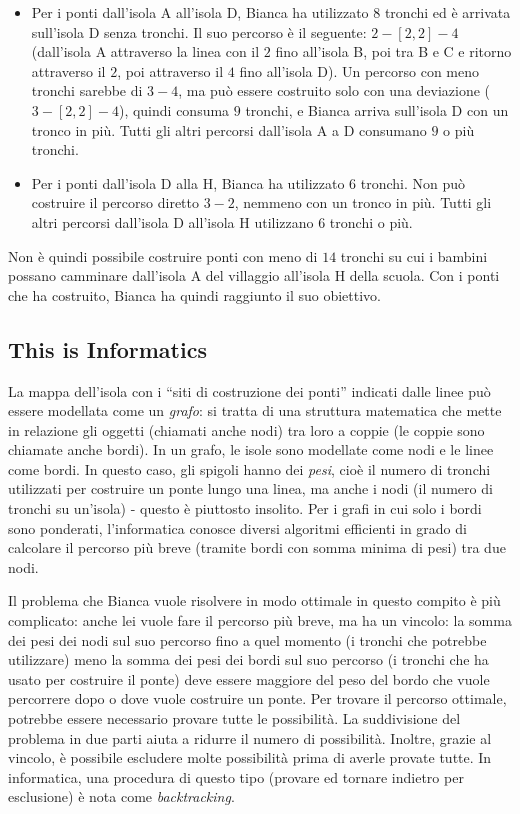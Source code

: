 \documentclass[a4paper,11pt]{report}
\begin{document}
\begin{itemize}
  \item Per i ponti dall’isola A all’isola D, Bianca ha utilizzato $8$ tronchi ed è arrivata sull’isola D senza tronchi.  Il suo percorso è il seguente: ${2-[2,2]-4}$ (dall’isola A attraverso la linea con il $2$ fino all’isola B, poi tra B e C e ritorno attraverso il $2$, poi attraverso il $4$ fino all’isola D). Un percorso con meno tronchi sarebbe di ${3-4}$, ma può essere costruito solo con una deviazione (${3-[2,2]-4}$), quindi consuma $9$ tronchi, e Bianca arriva sull’isola D con un tronco in più. Tutti gli altri percorsi dall’isola A a D consumano $9$ o più tronchi.
  \item Per i ponti dall’isola D alla H, Bianca ha utilizzato $6$ tronchi. Non può costruire il percorso diretto ${3-2}$, nemmeno con un tronco in più. Tutti gli altri percorsi dall’isola D all’isola H utilizzano $6$ tronchi o più.
\end{itemize}

Non è quindi possibile costruire ponti con meno di $14$ tronchi su cui i bambini possano camminare dall’isola A del villaggio all’isola H della scuola.  Con i ponti che ha costruito, Bianca ha quindi raggiunto il suo obiettivo.


\subsection*{This is Informatics}

La mappa dell’isola con i \enquote{siti di costruzione dei ponti} indicati dalle linee può essere modellata come un \emph{grafo}: si tratta di una struttura matematica che mette in relazione gli oggetti (chiamati anche nodi) tra loro a coppie (le coppie sono chiamate anche bordi).  In un grafo, le isole sono modellate come nodi e le linee come bordi. In questo caso, gli spigoli hanno dei \emph{pesi}, cioè il numero di tronchi utilizzati per costruire un ponte lungo una linea, ma anche i nodi (il numero di tronchi su un’isola) - questo è piuttosto insolito. Per i grafi in cui solo i bordi sono ponderati, l’informatica conosce diversi algoritmi efficienti in grado di calcolare il percorso più breve (tramite bordi con somma minima di pesi) tra due nodi.

Il problema che Bianca vuole risolvere in modo ottimale in questo compito è più complicato: anche lei vuole fare il percorso più breve, ma ha un vincolo: la somma dei pesi dei nodi sul suo percorso fino a quel momento (i tronchi che potrebbe utilizzare) meno la somma dei pesi dei bordi sul suo percorso (i tronchi che ha usato per costruire il ponte) deve essere maggiore del peso del bordo che vuole percorrere dopo o dove vuole costruire un ponte. Per trovare il percorso ottimale, potrebbe essere necessario provare tutte le possibilità. La suddivisione del problema in due parti aiuta a ridurre il numero di possibilità. Inoltre, grazie al vincolo, è possibile escludere molte possibilità prima di averle provate tutte. In informatica, una procedura di questo tipo (provare ed tornare indietro per esclusione) è nota come \emph{backtracking}.
\end{document}
